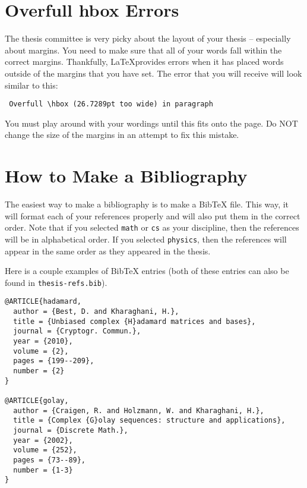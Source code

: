 \section[Overfull hbox Errors]{Overfull hbox Errors}
\label{sec:hbox}

The thesis committee is very picky about the layout of your thesis -- especially about margins. You need to make sure that all of your words fall within the correct margins. Thankfully, \LaTeX provides errors when it has placed words outside of the margins that you have set. The error that you will receive will look similar to this:
\begin{verbatim}
 Overfull \hbox (26.7289pt too wide) in paragraph
\end{verbatim}
You must play around with your wordings until this fits onto the page. Do NOT change the size of the margins
in an attempt to fix this mistake.

\section[How to Make a Bibliography]{How to Make a Bibliography}
\label{sec:bib}

The easiest way to make a bibliography is to make a BibTeX file. This way, it will 
format each of your references properly and will also put them in the correct order.
Note that if you selected \texttt{math} or \texttt{cs} as your discipline, then the
references will be in alphabetical order. If you selected \texttt{physics}, then the
references will appear in the same order as they appeared in the thesis.

Here is a couple examples of BibTeX entries (both of these entries can also be found in \texttt{thesis-refs.bib}).

\begin{singlespace}
\begin{lstlisting}
@ARTICLE{hadamard,
  author = {Best, D. and Kharaghani, H.},
  title = {Unbiased complex {H}adamard matrices and bases},
  journal = {Cryptogr. Commun.},
  year = {2010},
  volume = {2},
  pages = {199--209},
  number = {2}
}

@ARTICLE{golay,
  author = {Craigen, R. and Holzmann, W. and Kharaghani, H.},
  title = {Complex {G}olay sequences: structure and applications},
  journal = {Discrete Math.},
  year = {2002},
  volume = {252},
  pages = {73--89},
  number = {1-3}
}
\end{lstlisting}
\end{singlespace}

